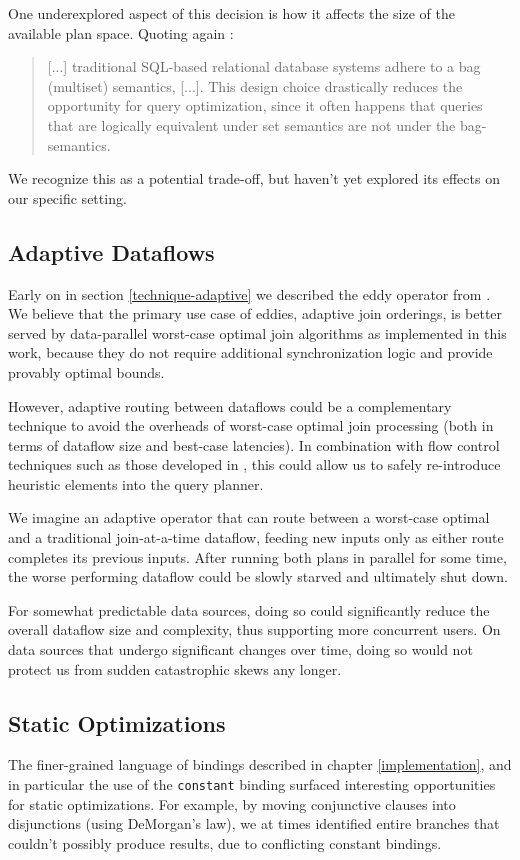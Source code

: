 \documentclass[../index.tex]{subfiles}
\begin{document}
One underexplored aspect of this decision is how it affects the size
of the available plan space. Quoting again \cite{aref2015design}:

\begin{quote}
  [...] traditional SQL-based relational database systems adhere to a
  bag (multiset) semantics, [...]. This design choice drastically
  reduces the opportunity for query optimization, since it often
  happens that queries that are logically equivalent under set
  semantics are not under the bag-semantics.
\end{quote}

We recognize this as a potential trade-off, but haven't yet explored
its effects on our specific setting.

\subsection{Adaptive Dataflows}

Early on in section \ref{technique-adaptive} we described the eddy
operator from \cite{avnur2000eddies}. We believe that the primary use
case of eddies, adaptive join orderings, is better served by
data-parallel worst-case optimal join algorithms as implemented in
this work, because they do not require additional synchronization
logic and provide provably optimal bounds.

However, adaptive routing between dataflows could be a complementary
technique to avoid the overheads of worst-case optimal join processing
(both in terms of dataflow size and best-case latencies). In
combination with flow control techniques such as those developed in
\cite{lattuada2016faucet}, this could allow us to safely re-introduce
heuristic elements into the query planner.

We imagine an adaptive operator that can route between a worst-case
optimal and a traditional join-at-a-time dataflow, feeding new inputs
only as either route completes its previous inputs. After running both
plans in parallel for some time, the worse performing dataflow could
be slowly starved and ultimately shut down.

For somewhat predictable data sources, doing so could significantly
reduce the overall dataflow size and complexity, thus supporting more
concurrent users. On data sources that undergo significant changes
over time, doing so would not protect us from sudden catastrophic
skews any longer.

\subsection{Static Optimizations}

The finer-grained language of bindings described in chapter
\ref{implementation}, and in particular the use of the
\texttt{constant} binding surfaced interesting opportunities for
static optimizations. For example, by moving conjunctive clauses into
disjunctions (using DeMorgan's law), we at times identified entire
branches that couldn't possibly produce results, due to conflicting
constant bindings.
\end{document}
